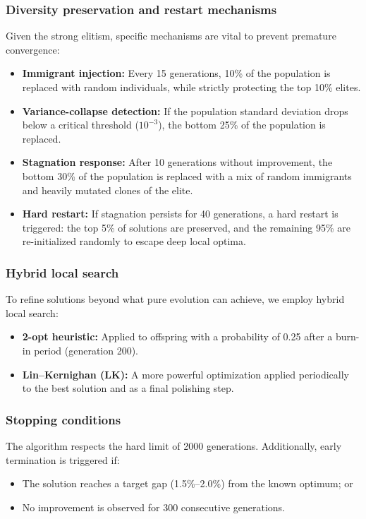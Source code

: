 \documentclass[11pt,a4paper]{article}
\begin{document}
\subsubsection*{Diversity preservation and restart mechanisms}
Given the strong elitism, specific mechanisms are vital to prevent premature convergence:
\begin{itemize}[nosep]
  \item \textbf{Immigrant injection:} Every 15 generations, 10\% of the population is replaced with random individuals, while strictly protecting the top 10\% elites.
  \item \textbf{Variance-collapse detection:} If the population standard deviation drops below a critical threshold ($10^{-3}$), the bottom 25\% of the population is replaced.
  \item \textbf{Stagnation response:} After 10 generations without improvement, the bottom 30\% of the population is replaced with a mix of random immigrants and heavily mutated clones of the elite.
  \item \textbf{Hard restart:} If stagnation persists for 40 generations, a hard restart is triggered: the top 5\% of solutions are preserved, and the remaining 95\% are re-initialized randomly to escape deep local optima.
\end{itemize}

\subsubsection*{Hybrid local search}
To refine solutions beyond what pure evolution can achieve, we employ hybrid local search:
\begin{itemize}[nosep]
  \item \textbf{2-opt heuristic:} Applied to offspring with a probability of 0.25 after a burn-in period (generation 200).
  \item \textbf{Lin--Kernighan (LK):} A more powerful optimization applied periodically to the best solution and as a final polishing step.
\end{itemize}

\subsubsection*{Stopping conditions}
The algorithm respects the hard limit of 2000 generations. Additionally, early termination is triggered if:
\begin{itemize}[nosep]
  \item The solution reaches a target gap (1.5\%--2.0\%) from the known optimum; or
  \item No improvement is observed for 300 consecutive generations.
\end{itemize}
\end{document}
